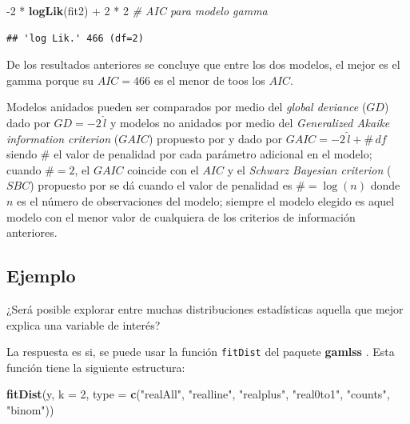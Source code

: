 \documentclass[10pt,]{krantz}
\makeatletter
\newenvironment{Shaded}{\begin{snugshade}}{\end{snugshade}}
\newcommand{\KeywordTok}[1]{\textcolor[rgb]{0.13,0.29,0.53}{\textbf{{#1}}}}
\newcommand{\DataTypeTok}[1]{\textcolor[rgb]{0.13,0.29,0.53}{{#1}}}
\newcommand{\DecValTok}[1]{\textcolor[rgb]{0.00,0.00,0.81}{{#1}}}
\newcommand{\StringTok}[1]{\textcolor[rgb]{0.31,0.60,0.02}{{#1}}}
\newcommand{\CommentTok}[1]{\textcolor[rgb]{0.56,0.35,0.01}{\textit{{#1}}}}
\newcommand{\NormalTok}[1]{{#1}}
\newenvironment{kframe}{%
\medskip{}
\setlength{\fboxsep}{.8em}
 \def\at@end@of@kframe{}%
 \ifinner\ifhmode%
  \def\at@end@of@kframe{\end{minipage}}%
  \begin{minipage}{\columnwidth}%
 \fi\fi%
 \def\FrameCommand##1{\hskip\@totalleftmargin \hskip-\fboxsep
 \colorbox{shadecolor}{##1}\hskip-\fboxsep
     \hskip-\linewidth \hskip-\@totalleftmargin \hskip\columnwidth}%
 \MakeFramed {\advance\hsize-\width
   \@totalleftmargin\z@ \linewidth\hsize
   \@setminipage}}%
 {\par\unskip\endMakeFramed%
 \at@end@of@kframe}
\renewenvironment{Shaded}{\begin{kframe}}{\end{kframe}}
\let\BeginKnitrBlock\begin \let\EndKnitrBlock\end
\makeatother
\begin{document}
\begin{Shaded}
\begin{Highlighting}[]
\NormalTok{-}\DecValTok{2} \NormalTok{*}\StringTok{ }\KeywordTok{logLik}\NormalTok{(fit2) +}\StringTok{ }\DecValTok{2} \NormalTok{*}\StringTok{ }\DecValTok{2}  \CommentTok{# AIC para modelo gamma}
\end{Highlighting}
\end{Shaded}

\begin{verbatim}
## 'log Lik.' 466 (df=2)
\end{verbatim}

De los resultados anteriores se concluye que entre los dos modelos, el
mejor es el gamma porque su \(AIC=466\) es el menor de toos los \(AIC\).

\BeginKnitrBlock{rmdnote}
Modelos anidados pueden ser comparados por medio del \emph{global
deviance} (\(GD\)) dado por \(GD=-2 \, \hat{l}\) y modelos no anidados
por medio del \emph{Generalized Akaike information criterion} (\(GAIC\))
propuesto por \citet{Akaike83} y dado por
\(GAIC=-2 \, \hat{l} + \# \, df\) siendo \(\#\) el valor de penalidad
por cada parámetro adicional en el modelo; cuando \(\# = 2\), el
\(GAIC\) coincide con el \(AIC\) y el \emph{Schwarz Bayesian criterion}
(\(SBC\)) propuesto por \citet{Schwarz} se dá cuando el valor de
penalidad es \(\# = \log(n)\) donde \(n\) es el número de observaciones
del modelo; siempre el modelo elegido es aquel modelo con el menor valor
de cualquiera de los criterios de información anteriores.
\EndKnitrBlock{rmdnote}

\subsection*{Ejemplo}\label{ejemplo-52}


¿Será posible explorar entre muchas distribuciones estadísticas aquella
que mejor explica una variable de interés?

La respuesta es si, se puede usar la función \texttt{fitDist} del
paquete \textbf{gamlss} . Esta función tiene la siguiente
estructura:

\begin{Shaded}
\begin{Highlighting}[]
\KeywordTok{fitDist}\NormalTok{(y, }\DataTypeTok{k =} \DecValTok{2}\NormalTok{, }
      \DataTypeTok{type =} \KeywordTok{c}\NormalTok{(}\StringTok{"realAll"}\NormalTok{, }\StringTok{"realline"}\NormalTok{, }\StringTok{"realplus"}\NormalTok{,}
               \StringTok{"real0to1"}\NormalTok{, }\StringTok{"counts"}\NormalTok{, }\StringTok{"binom"}\NormalTok{))}
\end{Highlighting}
\end{Shaded}
\end{document}
